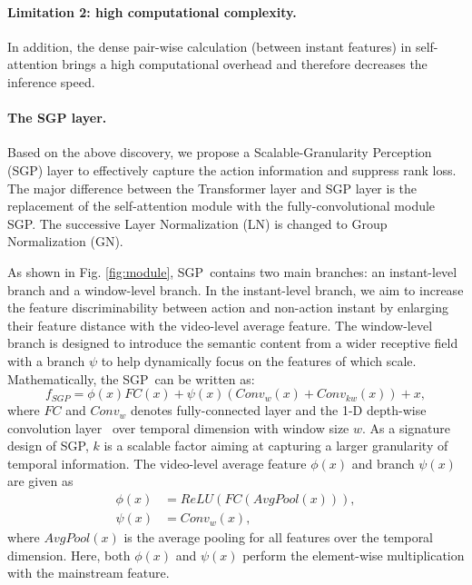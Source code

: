 \documentclass[10pt,twocolumn,letterpaper]{article}
\newcommand{\figref}[1]{Fig. \ref{#1}}
\def\modulename{SGP}
\begin{document}
\paragraph{Limitation 2: high computational complexity.}
In addition, the dense pair-wise calculation (between instant features) in self-attention brings a high computational overhead and therefore decreases the inference speed.

\begin{figure}[t]
\end{figure}

\paragraph{The SGP layer.}
Based on the above discovery, we propose a Scalable-Granularity Perception (\modulename) layer to effectively capture the action information and suppress rank loss. The major difference between the Transformer layer and SGP layer is the replacement of the self-attention module with the fully-convolutional module SGP. The successive Layer Normalization\cite{ba2016layer} (LN) is changed to Group Normalization\cite{wu2018group} (GN).

As shown in \figref{fig:module}, \modulename~contains two main branches: an instant-level branch and a window-level branch. 
In the instant-level branch, we aim to increase the feature discriminability between action and non-action instant by enlarging their feature distance with the video-level average feature. The window-level branch is designed to introduce the semantic content from a wider receptive field with a branch $\psi$ to help dynamically focus on the features of which scale.
Mathematically, the \modulename~can be written as:
\begin{equation}
    f_{SGP} = \phi(x)FC(x) + \psi(x)(Conv_w(x) + Conv_{kw}(x))+ x,
\end{equation}
where $FC$ and $Conv_w$ denotes fully-connected layer and the 1-D depth-wise convolution layer~\cite{chollet2017xception} over temporal dimension with window size $w$.
As a signature design of \modulename, $k$ is a scalable factor aiming at capturing a larger granularity of temporal information.
The video-level average feature $\phi(x)$ and branch $\psi(x)$ are given as
\begin{align}
    \phi(x) &= ReLU(FC(AvgPool(x))),\\
    \psi(x) &= Conv_w(x),
\end{align}
where $AvgPool(x)$ is the average pooling for all features over the temporal dimension. Here, both $\phi(x)$ and $\psi(x)$ perform the element-wise multiplication with the mainstream feature. 
\end{document}
